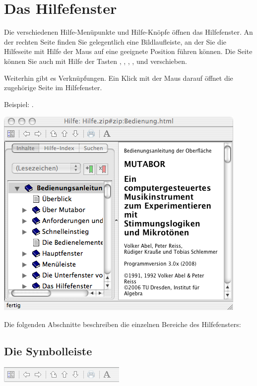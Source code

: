 {\chapter{Das Hilfefenster}\label{sec:HELPWINDOW}

Die verschiedenen Hilfe-Menüpunkte und Hilfe-Knöpfe öffnen das
Hilfefenster. An der rechten Seite finden Sie gelegentlich eine
Bildlaufleiste, an der Sie die Hilfeseite mit Hilfe der Maus auf eine
geeignete Position führen können. Die Seite können Sie auch mit Hilfe
der Tasten \LArrow, \UArrow, \DArrow, \RArrow, \PgUp{} und \PgDown{}
verschieben.

Weiterhin gibt es Verknüpfungen. Ein Klick mit der Maus darauf öffnet die 
zugehörige Seite im Hilfefenster. 

Beispiel: .

\ifhtml
{}
\else
\includegraphics{Hilfefenster}
\fi

Die folgenden Abschnitte beschreiben die einzelnen Bereiche des Hilfefensters:

\section{Die Symbolleiste}
\label{sec:die-symbolleiste}

\ifhtml
{}%
\else
\includegraphics{helptoolbar}
\fi

}

